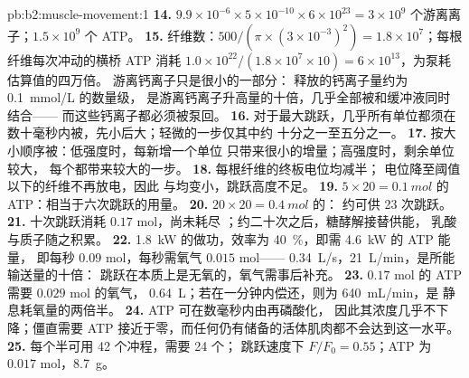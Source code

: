 \begin{solution}{pb:b2:muscle-movement:1}
\textbf{14.} $9.9\times 10^{-6}\times 5\times 10^{-10}\times 6\times
10^{23} = 3\times 10^{9}$ 个游离离子；$1.5\times 10^{9}$ 个 ATP。
\textbf{15.} 纤维数：$500/(\pi\times(3\times 10^{-3})^{2}) = 1.8\times
10^{7}$；每根纤维每次冲动的横桥 ATP 消耗 $1.0\times
10^{22}/(1.8\times 10^{7}\times 10) = 6\times 10^{13}$，为泵耗估算值的四万倍。
游离钙离子只是很小的一部分：
释放的钙离子量约为 \qty{0.1}{mmol/L} 的数量级，
是游离钙离子升高量的十倍，几乎全部被和缓冲液同时结合——
而这些钙离子都必须被泵回。
\textbf{16.} 对于最大跳跃，几乎所有单位都须在
数十毫秒内被，先小后大；轻微的一步仅其中约
十分之一至五分之一。
\textbf{17.} 按大小顺序被：低强度时，每新增一个单位
只带来很小的增量；高强度时，剩余单位较大，
每个都带来较大的一步。
\textbf{18.} 每根纤维的终板电位均减半；
电位降至阈值以下的纤维不再放电，因此
与均变小，跳跃高度不足。
\textbf{19.} $5\times 20 = \qty{0.1}{mol}$ 的 ATP：相当于六次跳跃的用量。
\textbf{20.} $20\times 20 = \qty{0.4}{mol}$ 的：
约可供 23 次跳跃。
\textbf{21.} 十次跳跃消耗 $0.17$ mol，尚未耗尽
；约二十次之后，糖酵解接替供能，
乳酸与质子随之积累。
\textbf{22.} \qty{1.8}{kW} 的做功，效率为 \qty{40}{\%}，即需 \qty{4.6}{kW} 的 ATP 能量，
即每秒 $0.09$ mol，每秒需氧气 $0.015$ mol——
\qty{0.34}{L/s}，\qty{21}{L/min}，是所能输送量的十倍：
跳跃在本质上是无氧的，氧气需事后补充。
\textbf{23.} $0.17$ mol 的 ATP 需要 $0.029$ mol 的氧气，
\qty{0.64}{L}；若在一分钟内偿还，则为 \qty{640}{mL/min}，是
静息耗氧量的两倍半。
\textbf{24.} ATP 可在数毫秒内由再磷酸化，
因此其浓度几乎不下降；僵直需要 ATP
接近于零，而任何仍有储备的活体肌肉都不会达到这一水平。
\textbf{25.} 每个半可用 42 个冲程，需要 24 个；
跳跃速度下 $F/F_0 = 0.55$；ATP 为 $0.017$ mol，\qty{8.7}{g}。
\end{solution}
